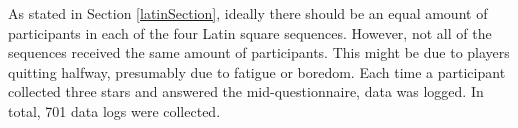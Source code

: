 
As stated in Section \ref{latinSection}, ideally there should be an equal amount of participants in each of the four Latin square sequences. However, not all of the sequences received the same amount of participants. This might be due to players quitting halfway, presumably due to fatigue or boredom. Each time a participant collected three stars and answered the mid-questionnaire, data was logged. In total, 701 data logs were collected.

